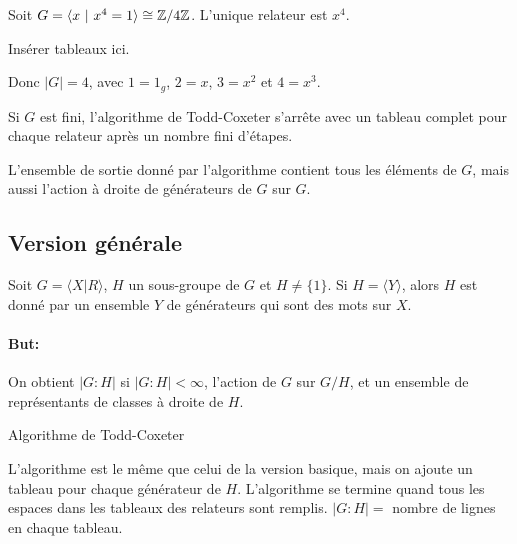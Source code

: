      \begin{ex}
       Soit $G = \langle x\ |\ x^4 = 1\rangle \cong \mathbb{Z}/4\mathbb{Z}$. L'unique relateur est $x^4$.
       \begin{center}
         Insérer tableaux ici.
       \end{center}
       Donc $|G| = 4$, avec $1 = 1_g$, $2 = x$, $3 = x^2$ et $4 = x^3$.
     \end{ex}

     


     \begin{theo}
       Si $G$ est fini, l'algorithme de Todd-Coxeter s'arrête avec un tableau complet pour chaque relateur
       après un nombre fini d'étapes.

       L'ensemble de sortie donné par l'algorithme contient tous les éléments de $G$, mais aussi l'action à
       droite de générateurs de $G$ sur $G$.
     \end{theo}


     \subsection{Version générale}

       Soit $G = \langle X | R \rangle$, $H$ un sous-groupe de $G$ et $H \neq \{1\}$. Si $H = \langle Y
       \rangle$, alors $H$ est donné par un ensemble $Y$ de générateurs qui sont des mots sur $X$.

       \paragraph{But:} On obtient $|G:H|$ si $|G:H| < \infty$, l'action de $G$ sur $G/H$, et un ensemble de
       représentants de classes à droite de $H$.

       
       \begin{algorithm}
       \caption{Algorithme de Todd-Coxeter}
       \label{alg:todd-coxeter}
       \begin{algorithmic}
         \State L'algorithme est le même que celui de la version basique, mais on ajoute un tableau pour chaque générateur de $H$.
         \State L'algorithme se termine quand tous les espaces dans les tableaux des relateurs sont remplis.
         \State $|G:H| = $ nombre de lignes en chaque tableau.
       \end{algorithmic} 
     \end{algorithm}

